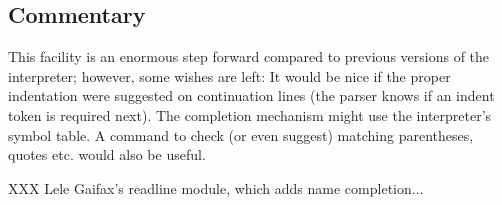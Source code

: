 \subsection{Commentary}

This facility is an enormous step forward compared to previous
versions of the interpreter; however, some wishes are left: It would
be nice if the proper indentation were suggested on continuation lines
(the parser knows if an indent token is required next).  The
completion mechanism might use the interpreter's symbol table.  A
command to check (or even suggest) matching parentheses, quotes etc.
would also be useful.

XXX Lele Gaifax's readline module, which adds name completion...



